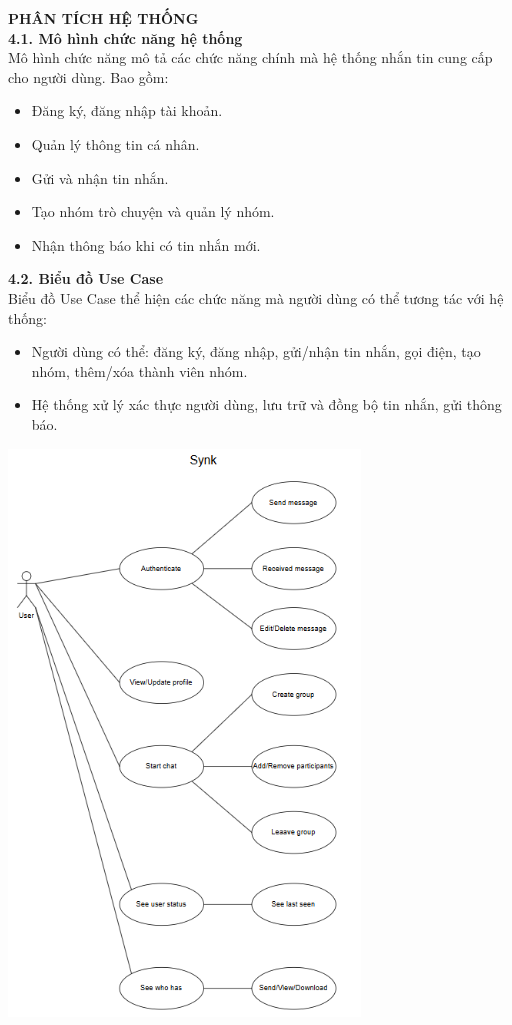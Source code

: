 \documentclass[12pt,a4paper]{article}
\begin{document}
	\vspace{0.5cm}
	\textbf{PHÂN TÍCH HỆ THỐNG} \\
	
	\textbf{4.1. Mô hình chức năng hệ thống} \\
	Mô hình chức năng mô tả các chức năng chính mà hệ thống nhắn tin cung cấp cho người dùng. Bao gồm:
	\begin{itemize}
		\item Đăng ký, đăng nhập tài khoản.
		\item Quản lý thông tin cá nhân.
		\item Gửi và nhận tin nhắn.
		\item Tạo nhóm trò chuyện và quản lý nhóm.
		\item Nhận thông báo khi có tin nhắn mới.
	\end{itemize}
	
	\textbf{4.2. Biểu đồ Use Case} \\
	Biểu đồ Use Case thể hiện các chức năng mà người dùng có thể tương tác với hệ thống:
	\begin{itemize}
		\item Người dùng có thể: đăng ký, đăng nhập, gửi/nhận tin nhắn, gọi điện, tạo nhóm, thêm/xóa thành viên nhóm.
		\item Hệ thống xử lý xác thực người dùng, lưu trữ và đồng bộ tin nhắn, gửi thông báo.
	\end{itemize}
	\includegraphics[width=0.7\textwidth]{usecase.png}\\[0.5cm]
	
\end{document}
